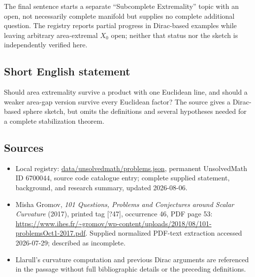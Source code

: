 \documentclass[11pt]{article}
\begin{document}
The final sentence starts a separate ``Subcomplete Extremality'' topic with an open, not necessarily complete manifold but supplies no complete additional question. The registry reports partial progress in Dirac-based examples while leaving arbitrary area-extremal \(X_0\) open; neither that status nor the sketch is independently verified here.
\subsection{Short English statement}
Should area extremality survive a product with one Euclidean line, and should a weaker area-gap version survive every Euclidean factor? The source gives a Dirac-based sphere sketch, but omits the definitions and several hypotheses needed for a complete stabilization theorem.
\subsection{Sources}
\begin{itemize}
\item Local registry: \url{data/unsolvedmath/problems.json}, permanent UnsolvedMath ID \(6700044\), source code catalogue entry; complete supplied statement, background, and research summary, updated 2026-08-06.
\item Misha Gromov, \emph{101 Questions, Problems and Conjectures around Scalar Curvature} (2017), printed tag [?47], occurrence 46, PDF page 53: \url{https://www.ihes.fr/~gromov/wp-content/uploads/2018/08/101-problemsOct1-2017.pdf}. Supplied normalized PDF-text extraction accessed 2026-07-29; described as incomplete.
\item Llarull's curvature computation and previous Dirac arguments are referenced in the passage without full bibliographic details or the preceding definitions.
\end{itemize}
\end{document}
